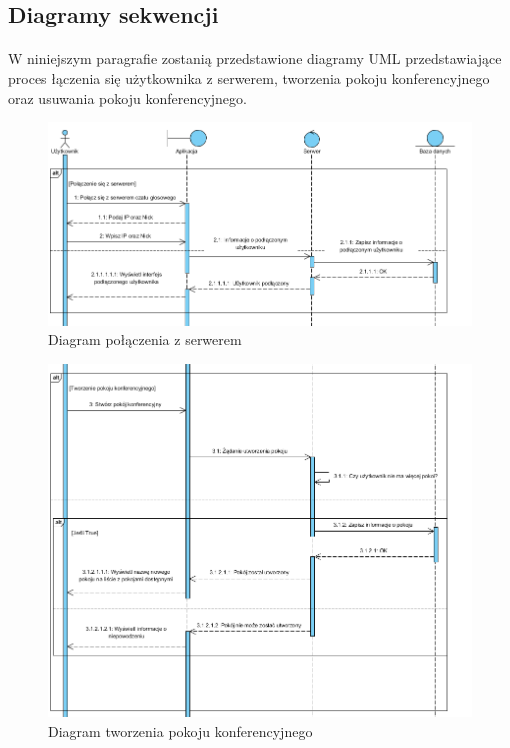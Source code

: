\documentclass{article}
\begin{document}
	\subsection{Diagramy sekwencji}
	\paragraph{} W niniejszym paragrafie zostanią przedstawione diagramy UML przedstawiające proces łączenia się użytkownika z serwerem, tworzenia pokoju konferencyjnego oraz usuwania pokoju konferencyjnego.
	\begin{figure}[H]
		\centering
		\hspace*{-2cm} 
		\includegraphics[scale=0.9]{seq1}
		\caption[]{Diagram połączenia z serwerem}
		\label{fig:seq1}
	\end{figure}
	\begin{figure}[H]
		\centering
		\hspace*{-2cm} 
		\includegraphics[scale=0.9]{seq2}
		\caption[]{Diagram tworzenia pokoju konferencyjnego}
		\label{fig:seq2}
	\end{figure}
\end{document}
